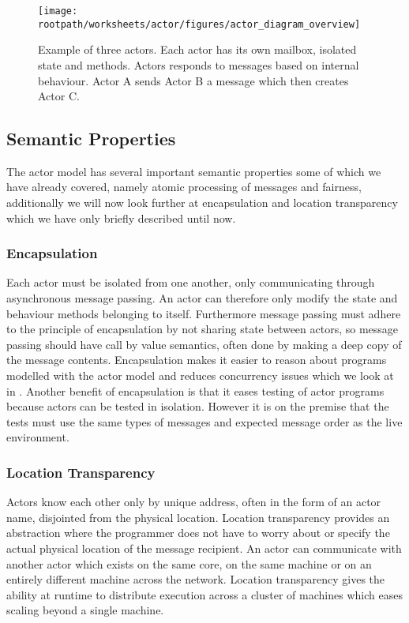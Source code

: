 \begin{figure}[h!]
\centering
\texttt{[image: \\rootpath/worksheets/actor/figures/actor\_diagram\_overview]}
\caption{Example of three actors. Each actor has its own mailbox, isolated state and methods. Actors responds to messages based on internal behaviour. Actor A sends Actor B a message which then creates Actor C.}\label{fig:actor_overview}
\end{figure}

\subsection{Semantic Properties}\label{ssec:actor_s_properties}
The actor model has several important semantic properties some of which we have already covered, namely atomic processing of messages and fairness, additionally we will now look further at encapsulation and location transparency which we have only briefly described until now\cite{karmani2011actors}.

\subsubsection{Encapsulation}
Each actor must be isolated from one another, only communicating through asynchronous message passing. An actor can therefore only modify the state and behaviour methods belonging to itself. Furthermore message passing must adhere to the principle of encapsulation by not sharing state between actors, so message passing should have call by value semantics, often done by making a deep copy of the message contents\cite[p. 2]{karmani2009actor}. Encapsulation makes it easier to reason about programs modelled with the actor model\cite[p. 3]{karmani2009actor} and reduces concurrency issues which we look at in . Another benefit of encapsulation is that it eases testing of actor programs because actors can be tested in isolation. However it is on the premise that the tests must use the same types of messages and expected message order as the live environment\cite[p. 151]{sevenModels}.

\subsubsection{Location Transparency}
Actors know each other only by unique address, often in the form of an actor name, disjointed from the physical location. Location transparency provides an abstraction where the programmer does not have to worry about or specify the actual physical location of the message recipient. An actor can communicate with another actor which exists on the same core, on the same machine or on an entirely different machine across the network\cite[p. 3]{karmani2009actor}. Location transparency gives the ability at runtime to distribute execution across a cluster of machines which eases scaling beyond a single machine.

